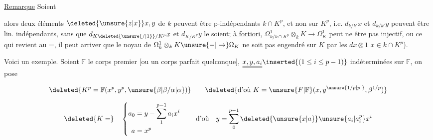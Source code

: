 
\uline{Remarque} Soient


alors deux éléments $\deleted{\unsure{z|x}}x,y$ de $k$ peuvent être p-indépendants   $k\cap K^p$, et non  sur $K^p$, i.e. $d_{k/k'}x$ et $d_{k/k'}y$ peuvent être lin. indépendants, sans que $d_{K\deleted{\unsure{/|1}}/K^p}x$ et $d_{K/K^p}y$ le soient; \uline{à fortiori}, $\Omega^1_{k/k\cap K^p}\otimes_k K\to\Omega^1_K$ peut ne être pas injectif, ou  ce qui revient au =, il peut arriver que le noyau  de $\Omega^1_k\otimes_k K\unsure{-|\to}\Omega_K$ ne soit pas engendré sur $K$ par les $dx\otimes1$  $x\in k\cap K^p$).



 Voici un exemple. Soient $\mathbb{F}$ le corps premier [ou un corps parfait quelconque], $\underline{\underline{x,y,a_i}}\inserted{(1\leq i\leq p-1)}$  indéterminées sur $\mathbb{F}$, on pose 

\[ \deleted{K^p=\mathbb{F}(x^p,y^p,\unsure{\beta|\beta/\alpha|\alpha})}\qquad\deleted{\text{d'où }K=\unsure{F|\mathbb F}(x,y^{\unsure{1/p|p|\vphantom{p}}},\beta^{1/p})} \]

\[ \deleted{K=}\quad \left\{\begin{aligned} a_0&=y-\sum_{1}^{p-1}a_ix^i\\ a&=x^p\end{aligned}\right. \qquad \text{d'où}\quad y=\sum_{0}^{p-1}\deleted{\unsure{x|a}}\unsure{a_i|a_i^p}x^i \]


